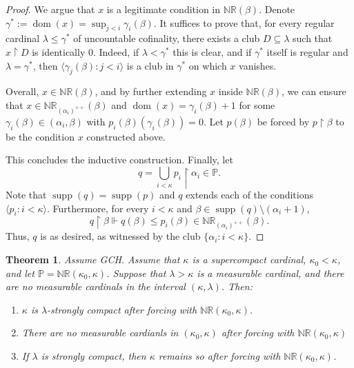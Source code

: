 \documentclass[11pt]{amsart}
\renewcommand{\restriction}{\mathbin\upharpoonright}    %
\newtheorem{theorem}{Theorem}[section]
\theoremstyle{definition}
\newcounter{condition}
\theoremstyle{remark}
\newcommand\<{{<}}
\DeclareMathOperator{\supp}{supp}
\newcommand{\dom}{\mathop{\mathrm{dom}}\nolimits}
\newcommand{\po}{\mathbb{P}}
\newcommand{\la}{\langle}
\newcommand{\ra}{\rangle}
\begin{document}
\begin{proof}
    We argue that $x$ is a legitimate condition in $\mathbb{NR}(\beta)$. Denote $\gamma^*:=\dom(x) = \sup_{j<i} \gamma_i(\beta)$. It suffices to prove that, for every regular cardinal $\lambda \leq \gamma^*$ of uncountable cofinality, there exists a club $D\subseteq \lambda$ such that $x\restriction D$ is identically $0$. Indeed, if $\lambda< \gamma^*$ this is clear, and if $\gamma^*$ itself is regular and $\lambda = \gamma^*$, then $\la \gamma_j(\beta) \colon j<i \ra$ is a club in $\gamma^*$ on which $x$ vanishes. 
    
    Overall, $x\in \mathbb{NR}(\beta)$, and by further extending $x$ inside $\mathbb{NR}(\beta)$, we can ensure that $x\in \mathbb{NR}_{(\alpha_i)^{++}}(\beta)$ and $\dom(x) = \gamma_i(\beta)+1$ for some $\gamma_i(\beta)\in (\alpha_i, \beta)$ with $p_i(\beta)(\gamma_i(\beta)) = 0$. Let $p(\beta)$ be forced by $p\restriction \beta$ to be the condition $x$ constructed above.
    
    This concludes the inductive construction. Finally, let 
    $$q = \bigcup_{i<\kappa} p_i\restriction \alpha_i \in \po.$$
    Note that $\supp(q) = \supp(p)$ and $q$ extends each of the conditions $\la p_i \colon i<\kappa \ra$. Furthermore, for every $i<\kappa$ and $\beta\in \supp(q)\setminus (\alpha_i+1)$, 
    $$ q\restriction \beta \Vdash q(\beta) \leq p_i(\beta) \in \mathbb{NR}_{(\alpha_{i})^{++}}(\beta).$$
    Thus, $q$ is as desired, as witnessed by the club $\{ \alpha_i \colon i<\kappa \}$.
    \end{proof}
    
    
    \begin{theorem}\label{thm: Strong compactness after iterating nonreflecting stat sets} 
        Assume {\rm{GCH}}. Assume that $\kappa$ is a supercompact cardinal, $\kappa_0<\kappa$, and let $\po = \mathbb{NR}(\kappa_0, \kappa)$. Suppose that $\lambda > \kappa$ is a measurable cardinal, and there are no measurable cardinals in the interval $(\kappa, \lambda)$. Then:
        \begin{enumerate}
            \item \label{clause: NR sometimes make supercompact into strongly compact 1} $\kappa$ is $\lambda$-strongly compact after forcing with $\mathbb{NR}(\kappa_0, \kappa)$.
            \item  \label{clause: NR sometimes make supercompact into strongly compact 1.5} There are no measurable cardianls in  $(\kappa_0, \kappa)$ after forcing with $\mathbb{NR}(\kappa_0, \kappa)$
            \item \label{clause: NR sometimes make supercompact into strongly compact 2} If $\lambda$ is strongly compact, then $\kappa$ remains so after forcing with $\mathbb{NR}(\kappa_0, \kappa)$.
        \end{enumerate}
    \end{theorem}
\end{document}
